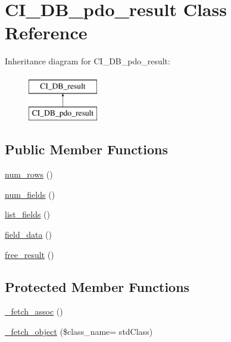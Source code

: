 \hypertarget{class_c_i___d_b__pdo__result}{}\section{C\+I\+\_\+\+D\+B\+\_\+pdo\+\_\+result Class Reference}
\label{class_c_i___d_b__pdo__result}
Inheritance diagram for C\+I\+\_\+\+D\+B\+\_\+pdo\+\_\+result\+:\begin{figure}[H]
\begin{center}
\leavevmode
\includegraphics[height=2.000000cm]{class_c_i___d_b__pdo__result}
\end{center}
\end{figure}
\subsection*{Public Member Functions}
\begin{DoxyCompactItemize}
\item 
\hyperlink{class_c_i___d_b__pdo__result_a218657c303ee499b97710ab0cd2f5d6e}{num\+\_\+rows} ()
\item 
\hyperlink{class_c_i___d_b__pdo__result_af831bf363e4d7d661a717a4932af449d}{num\+\_\+fields} ()
\item 
\hyperlink{class_c_i___d_b__pdo__result_a50b54eb4ea7cfd039740f532988ea776}{list\+\_\+fields} ()
\item 
\hyperlink{class_c_i___d_b__pdo__result_a84bffd65e53902ade1591716749a33e3}{field\+\_\+data} ()
\item 
\hyperlink{class_c_i___d_b__pdo__result_aad2d98d6beb3d6095405356c6107b473}{free\+\_\+result} ()
\end{DoxyCompactItemize}
\subsection*{Protected Member Functions}
\begin{DoxyCompactItemize}
\item 
\hyperlink{class_c_i___d_b__pdo__result_a43a9a92817f1334a1c10752ec44275a0}{\+\_\+fetch\+\_\+assoc} ()
\item 
\hyperlink{class_c_i___d_b__pdo__result_ac0acae0a13c8bfe4c34198813ecf43a0}{\+\_\+fetch\+\_\+object} (\$class\+\_\+name= \textquotesingle{}std\+Class\textquotesingle{})
\end{DoxyCompactItemize}
